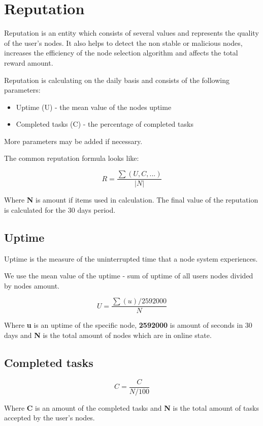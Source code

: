 \section{Reputation}

Reputation is an entity which consists of several values and represents the quality of the user's nodes.
It also helps to detect the non stable or malicious nodes,
increases the efficiency of the node selection algorithm and
affects the total reward amount.

Reputation is calculating on the daily basis and consists of the following parameters:

\begin{itemize}
    \item Uptime (U) - the mean value of the nodes uptime
    \item Completed tasks (C) - the percentage of completed tasks
\end{itemize}

More parameters may be added if necessary.

The common reputation formula looks like:

\[
    R = \frac{\sum(U, C, ...)}{\vert{N}\vert}
\]

Where \textbf{N} is amount if items used in calculation.
The final value of the reputation is calculated for the 30 days period.

\subsection{Uptime}

Uptime is the measure of the uninterrupted time that a node system experiences.

We use the mean value of the uptime - sum of uptime of all users nodes divided by nodes amount.

\[
    U = \frac{\sum(u) / 2592000}{N}
\]

Where \textbf{u} is an uptime of the specific node, \textbf{2592000} is amount of seconds in 30 days and \textbf{N} is the total amount of nodes which are in online state.

\subsection{Completed tasks}

\[
    C = \frac{C}{N / 100}
\]

Where \textbf{C} is an amount of the completed tasks and \textbf{N} is the total amount of tasks accepted by the user's nodes.

